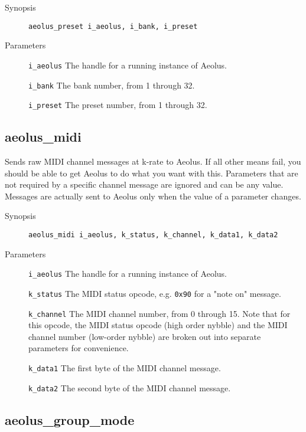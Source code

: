 \documentclass[english,11pt,letterpaper,onecolumn]{scrartcl}
\begin{document}
{\begin{description}
	\item[Synopsis]
	\item[]\lstinline|aeolus_preset i_aeolus, i_bank, i_preset|
	\item[Parameters]
	\item[]\lstinline|i_aeolus| The handle for a running instance of Aeolus.
	\item[]\lstinline|i_bank| The bank number, from 1 through 32.
	\item[]\lstinline|i_preset| The preset number, from 1 through 32.
\end{description}

\subsection*{aeolus\_midi}

Sends raw MIDI channel messages at k-rate to Aeolus. If all other means fail, you should be able to get Aeolus to do what you want with this. Parameters that are not required by a specific channel message are ignored and can be any value. Messages are actually sent to Aeolus only when the value of a parameter changes.

\begin{description}
	\item[Synopsis]
	\item[]\lstinline|aeolus_midi i_aeolus, k_status, k_channel, k_data1, k_data2|
	\item[Parameters]
	\item[]\lstinline|i_aeolus| The handle for a running instance of Aeolus.
	\item[]\lstinline|k_status| The MIDI status opcode, e.g. \verb|0x90| for a "note on" message.
	\item[]\lstinline|k_channel| The MIDI channel number, from 0 through 15. Note that for this opcode, the MIDI status opcode (high order nybble) and the MIDI channel number (low-order nybble) are broken out into separate parameters for convenience.
	\item[]\lstinline|k_data1| The first byte of the MIDI channel message.
	\item[]\lstinline|k_data2| The second byte of the MIDI channel message.
\end{description}

\subsection*{aeolus\_group\_mode}

}
\end{document}
